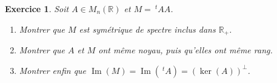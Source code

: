 \documentclass[12pt,a4paper]{article}
\newcommand{\R}{\mathbb{R}}
\DeclareMathOperator{\Ima }{Im}
\theoremstyle{break}
\newtheorem{Exo}{Exercice}
\begin{document}
\begin{Exo}
	Soit $A\in M_n(\R)$ et $M=\ ^tAA$.
	\begin{enumerate}
		\item
		Montrer que $M$ est symétrique de spectre inclus dans $\R_+$.
		\item
		Montrer que $A$ et $M$ ont même noyau, puis qu'elles ont même rang.
		\item
		Montrer enfin que $\Ima(M)=\Ima(\ ^tA)=(\ker(A))^{\perp}$.
	\end{enumerate}
\end{Exo}
\end{document}
